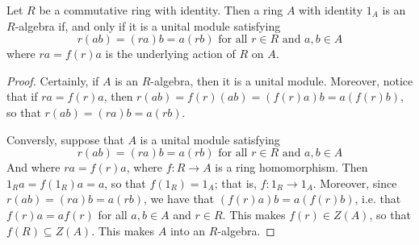 \begin{lemma}\label{lema_4.1.4}
    Let $R$ be a commutative ring with identity. Then a ring  $A$ with identity
     $1_A$ is an  $R$-algebra if, and only if it is a unital module satisfying
     \begin{equation*}
         r(ab)=(ra)b=a(rb) \text{ for all } r \in R \text{ and } a,b \in A
     \end{equation*}
     where $ra=f(r)a$ is the underlying action of $R$ on $A$.
\end{lemma}
\begin{proof}
    Certainly, if $A$ is an  $R$-algebra, then it is a unital module. Moreover,
    notice that if $ra=f(r)a$, then $r(ab)=f(r)(ab)=(f(r)a)b=a(f(r)b)$, so that
    $r(ab)=(ra)b=a(rb)$.

    Conversly, suppose that $A$ is a unital module satisfying
     \begin{equation*}
         r(ab)=(ra)b=a(rb) \text{ for all } r \in R \text{ and } a,b \in A
     \end{equation*}
     And where $ra=f(r)a$, where $f:R \xrightarrow{} A$ is a ring homomorphism.
     Then $1_Ra=f(1_R)a=a$, so that $f(1_R)=1_A$; that is, $f:1_R \xrightarrow{}
     1_A$. Moreover, since $r(ab)=(ra)b=a(rb)$, we have that
     $(f(r)a)b=a(f(r)b)$, i.e. that $f(r)a=af(r)$ for all $a,b \in A$ and  $r
     \in R$. This makes $f(r) \in Z(A)$, so that $f(R) \subseteq Z(A)$. This
     makes $A$ into an  $R$-algebra.
\end{proof}
